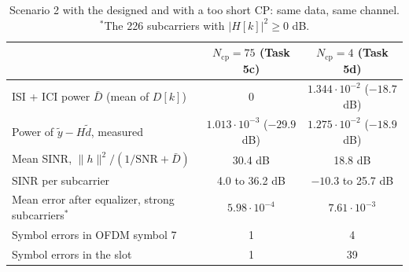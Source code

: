 \documentclass[11pt,a4paper]{article}
\newcommand{\Ncp}{N_{\mathrm{cp}}}
\newcommand{\SNR}{\mathrm{SNR}}
\newcommand{\yt}{\tilde{y}}
\newcommand{\dt}{\tilde{d}}
\begin{document}
\begin{table}[!htb]
  \centering
  \caption{Scenario 2 with the designed and with a too short CP: same data, same channel.
    $^*$The 226 subcarriers with $|H[k]|^2 \ge 0$ dB.}
  \label{tab:short}
  \small
  \begin{tabular}{lcc}
    \toprule
    & $\Ncp = 75$ (Task 5c) & $\Ncp = 4$ (Task 5d) \\
    \midrule
    ISI + ICI power $\bar{D}$ (mean of $D[k]$)           & 0                                  & $1.344 \cdot 10^{-2}$ ($-18.7$ dB) \\
    Power of $\yt - H\dt$, measured                      & $1.013 \cdot 10^{-3}$ ($-29.9$ dB) & $1.275 \cdot 10^{-2}$ ($-18.9$ dB) \\
    Mean SINR, $\|h\|^2 / (1/\SNR + \bar{D})$            & 30.4 dB                            & 18.8 dB \\
    SINR per subcarrier                                 & 4.0 to 36.2 dB                     & $-10.3$ to 25.7 dB \\
    Mean error after equalizer, strong subcarriers$^*$  & $5.98 \cdot 10^{-4}$               & $7.61 \cdot 10^{-3}$ \\
    Symbol errors in OFDM symbol 7                      & 1                                  & 4 \\
    Symbol errors in the slot                           & 1                                  & 39 \\
    \bottomrule
  \end{tabular}
\end{table}
\end{document}

